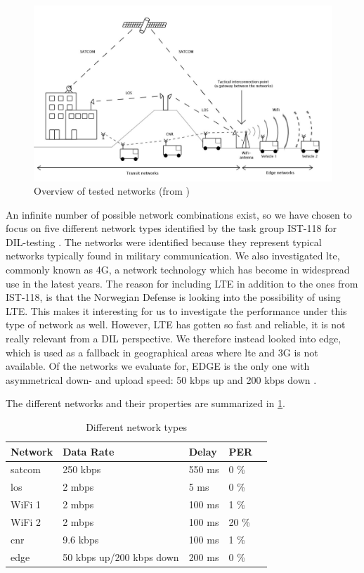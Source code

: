 \begin{figure}[h]
\includegraphics[width=\textwidth]{images/networks_overview.pdf}
\caption{Overview of tested networks (from \cite{krog-pisa})}
\label{figure-networks-overview}
\end{figure}

An infinite number of possible network combinations exist, so we have chosen to
focus on five different network types identified by the task group IST-118 for
DIL-testing \cite{johnsen-recommendations}. The networks were identified because
they represent typical networks typically found in military communication. We
also investigated \gls{lte}, commonly known as 4G, a network technology which
has become in widespread use in the latest years. The reason for including LTE
in addition to the ones from IST-118, is that the Norwegian Defense is looking
into the possibility of using LTE. This makes it interesting for us to
investigate the performance under this type of network as well. However, LTE has
gotten so fast and reliable, it is not really relevant from a DIL perspective.
We therefore instead looked into \gls{edge}, which is used as a fallback in
geographical areas where \gls{lte} and 3G is not available. Of the networks we
evaluate for, EDGE is the only one with asymmetrical down- and upload speed: 50
kbps up and 200 kbps down \cite{evaluation-transport-protocols-web-services}.

The different networks and their properties are summarized in
\cref{table-network-types}.

\begin{table}[h]
\begin{tabular}{| l | l | l | l | l |}
\hline
  \textbf{Network} & \textbf{Data Rate} & \textbf{Delay} & \textbf{PER} \\ \hline
  \gls{satcom} & 250 kbps & 550 ms & 0 \% \\ \hline
  \gls{los} & 2 mbps & 5 ms & 0 \% \\ \hline
  WiFi 1 & 2 mbps & 100 ms & 1 \% \\ \hline
  WiFi 2 & 2 mbps & 100 ms & 20 \% \\ \hline
  \gls{cnr} & 9.6 kbps & 100 ms & 1 \% \\ \hline
  \gls{edge} & 50 kbps up/200 kbps down & 200 ms & 0 \% \\ \hline
\end{tabular}
\caption{Different network types}
\label{table-network-types}
\end{table}


